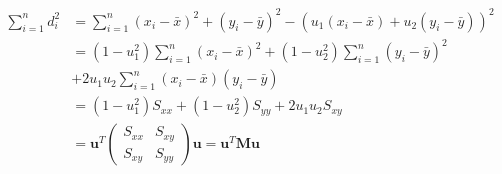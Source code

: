 \begin{equation*}
\begin{split}
    \sum_{i=1}^n d_i^2 
    &= \sum_{i=1}^n(x_i - \bar{x})^2+(y_i - \bar{y})^2-(u_1(x_i - \bar{x})+u_2(y_i - \bar{y}))^2 \\
    &=(1-u_1^{2})\sum_{i=1}^n(x_i - \bar{x})^2+
    (1-u_2^{2})\sum_{i=1}^n(y_i - \bar{y})^2\\
    &+2u_1u_2\sum_{i=1}^n(x_i - \bar{x})(y_i - \bar{y})\\
    &= (1-u_1^{2})S_{xx}+
    (1-u_2^{2})S_{yy}+2u_1u_2S_{xy}\\
    &=\mathbf{u}^T
    \begin{pmatrix}
    S_{xx} & S_{xy} \\
    S_{xy} & S_{yy} 
    \end{pmatrix} 
    \mathbf{u} = \mathbf{u}^T\mathbf{M}\mathbf{u}
\end{split}
\end{equation*}
